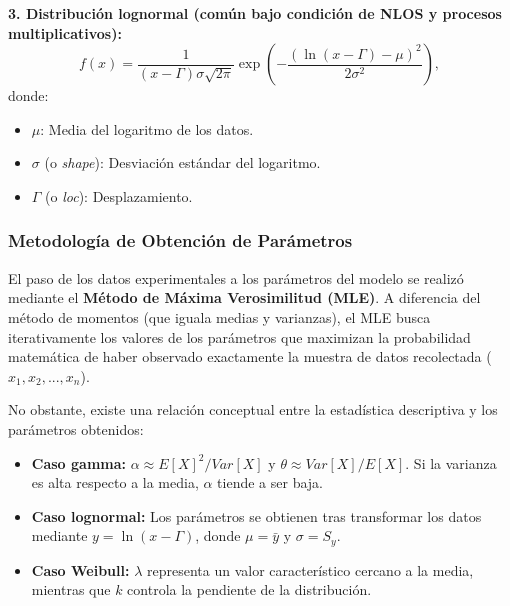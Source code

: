 \textbf{3. Distribución lognormal (común bajo condición de NLOS y procesos multiplicativos):}
%
\begin{equation}
f(x) = \frac{1}{(x-\Gamma) \sigma \sqrt{2\pi}} \exp\left(-\frac{(\ln(x-\Gamma) - \mu)^2}{2\sigma^2}\right),
\end{equation}
%
donde:
%
\begin{itemize}
    \item $\mu$: Media del logaritmo de los datos.
    \item $\sigma$ (o \textit{shape}): Desviación estándar del logaritmo.
    \item $\Gamma$ (o \textit{loc}): Desplazamiento.
\end{itemize}

\subsubsection{Metodología de Obtención de Parámetros}

El paso de los datos experimentales a los parámetros del modelo se realizó mediante el \textbf{Método de Máxima Verosimilitud (MLE)}. A diferencia del método de momentos (que iguala medias y varianzas), el MLE busca iterativamente los valores de los parámetros que maximizan la probabilidad matemática de haber observado exactamente la muestra de datos recolectada ($x_1, x_2, ..., x_n$).

No obstante, existe una relación conceptual entre la estadística descriptiva y los parámetros obtenidos:
%
\begin{itemize}
    \item \textbf{Caso gamma:} $\alpha \approx E[X]^2 / Var[X]$ y $\theta \approx Var[X] / E[X]$. Si la varianza es alta respecto a la media, $\alpha$ tiende a ser baja.
    \item \textbf{Caso lognormal:} Los parámetros se obtienen tras transformar los datos mediante $y = \ln(x-\Gamma)$, donde $\mu = \bar{y}$ y $\sigma = S_y$.
    \item \textbf{Caso Weibull:} $\lambda$ representa un valor característico cercano a la media, mientras que $k$ controla la pendiente de la distribución.
\end{itemize}


